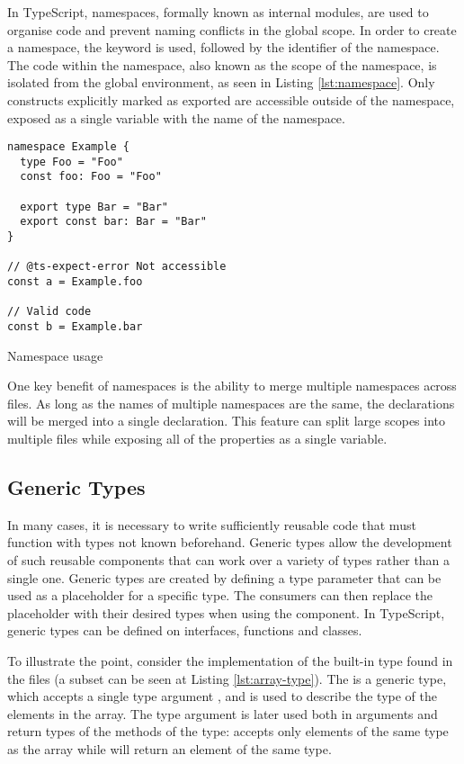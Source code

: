 In TypeScript, namespaces, formally known as internal modules, are used to organise code and prevent naming conflicts in the global scope. In order to create a namespace, the  keyword is used, followed by the identifier of the namespace. The code within the namespace, also known as the scope of the namespace, is isolated from the global environment, as seen in Listing \ref{lst:namespace}. Only constructs explicitly marked as exported are accessible outside of the namespace, exposed as a single variable with the name of the namespace.

\begin{listing}[ht]
  \begin{verbatim}
namespace Example {
  type Foo = "Foo"
  const foo: Foo = "Foo"
  
  export type Bar = "Bar"
  export const bar: Bar = "Bar"
}

// @ts-expect-error Not accessible
const a = Example.foo 

// Valid code
const b = Example.bar
\end{verbatim}
  \caption{Namespace usage}\label{lst:namespace}
\end{listing}

One key benefit of namespaces is the ability to merge multiple namespaces across files. As long as the names of multiple namespaces are the same, the declarations will be merged into a single declaration. This feature can split large scopes into multiple files while exposing all of the properties as a single variable.

\subsection{Generic Types}

In many cases, it is necessary to write sufficiently reusable code that must function with types not known beforehand. Generic types allow the development of such reusable components that can work over a variety of types rather than a single one. Generic types are created by defining a type parameter that can be used as a placeholder for a specific type. The consumers can then replace the placeholder with their desired types when using the component. In TypeScript, generic types can be defined on interfaces, functions and classes.

To illustrate the point, consider the implementation of the built-in  type found in the  files (a subset can be seen at Listing \ref{lst:array-type}). The  is a generic type, which accepts a single type argument , and is used to describe the type of the elements in the array. The type argument  is later used both in arguments and return types of the methods of the  type:  accepts only elements of the same type as the array while  will return an element of the same type.

